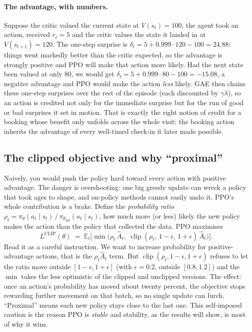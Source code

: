 \documentclass[11pt]{article}
\newcommand{\key}[1]{\textit{#1}}            %
\begin{document}
\paragraph{The advantage, with numbers.} Suppose the critic valued the current state at
$V(s_t) = 100$, the agent took an action, received $r_t = 5$ and the critic values the
state it landed in at $V(s_{t+1}) = 120$. The one-step surprise is
$\delta_t = 5 + 0.999\cdot 120 - 100 = 24.88$: things went markedly better than the critic
expected, so the advantage is strongly positive and PPO will make that action more likely.
Had the next state been valued at only $80$, we would get
$\delta_t = 5 + 0.999\cdot 80 - 100 = -15.08$, a negative advantage and PPO would make the
action \emph{less} likely. GAE then chains these one-step surprises over the rest of the
episode (each discounted by $\gamma\lambda$), so an action is credited not only for the
immediate surprise but for the run of good or bad surprises it set in motion. That is
exactly the right notion of credit for a booking whose benefit only unfolds across the whole
visit: the booking action inherits the advantage of every well-timed check-in it later made
possible.

\subsection{The clipped objective and why ``proximal''}

Naively, you would push the policy hard toward every action with positive advantage. The
danger is overshooting: one big greedy update can wreck a policy that took ages to shape,
and on-policy methods cannot easily undo it. PPO's whole contribution is a brake. Define
the \key{probability ratio} $\rho_t = \pi_\theta(a_t\mid s_t)\,/\,\pi_{\theta_{\text{old}}}(a_t\mid s_t)$,
how much more (or less) likely the new policy makes the action than the policy that
collected the data. PPO maximises
\begin{equation}
L^{\text{CLIP}}(\theta)\;=\;\mathbb{E}_t\Big[\min\big(\rho_t\,\hat A_t,\;\operatorname{clip}(\rho_t,\,1-\epsilon,\,1+\epsilon)\,\hat A_t\big)\Big].
\label{eq:ppoclip}
\end{equation}
Read it as a careful instruction. We want to increase probability for positive-advantage
actions, that is the $\rho_t \hat A_t$ term. But $\operatorname{clip}(\rho_t, 1-\epsilon,
1+\epsilon)$ refuses to let the ratio move outside $[1-\epsilon, 1+\epsilon]$ (with
$\epsilon = 0.2$, outside $[0.8, 1.2]$) and the $\min$ takes the less optimistic of the
clipped and unclipped versions. The effect: once an action's probability has moved about
twenty percent, the objective stops rewarding further movement on that batch, so no single
update can lurch. ``Proximal'' means each new policy stays close to the last one. This
self-imposed caution is the reason PPO is \key{stable} and stability, as the results will
show, is most of why it wins.
\end{document}
